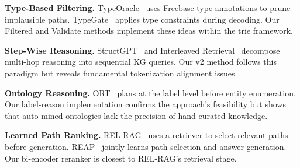 \documentclass[11pt,twoside]{article}
\begin{document}
\textbf{Type-Based Filtering.} TypeOracle~\citep{ravichander2022typeoracle}
uses Freebase type annotations to prune implausible paths.
TypeGate~\citep{fernando2023typegate} applies type constraints during decoding.
Our Filtered and Validate methods implement these ideas within the trie
framework.

\textbf{Step-Wise Reasoning.} StructGPT~\citep{jiang2023structgpt} and
Interleaved Retrieval~\citep{feng2024interleaved} decompose multi-hop reasoning
into sequential KG queries. Our v2 method follows this paradigm but reveals
fundamental tokenization alignment issues.

\textbf{Ontology Reasoning.} ORT~\citep{ort2025} plans at the label level before
entity enumeration. Our label-reason implementation confirms the approach's
feasibility but shows that auto-mined ontologies lack the precision of
hand-curated knowledge.

\textbf{Learned Path Ranking.} REL-RAG~\citep{tang2024relrag} uses a retriever
to select relevant paths before generation. REAP~\citep{zhang2025reap} jointly
learns path selection and answer generation. Our bi-encoder reranker is closest
to REL-RAG's retrieval stage.



\end{document}
